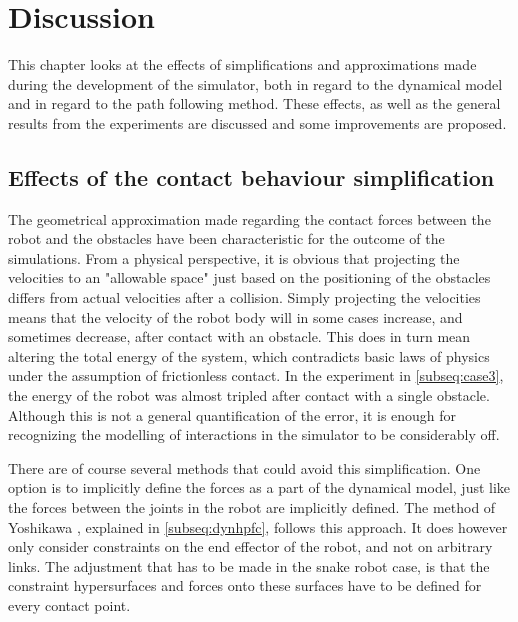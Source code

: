 \chapter{Discussion} \label{ch:discussion}

This chapter looks at the effects of simplifications and approximations made during the development of the simulator, both in regard to the dynamical model and in regard to the path following method. These effects, as well as the general results from the experiments are discussed and some improvements are proposed.

\section{Effects of the contact behaviour simplification}

The geometrical approximation made regarding the contact forces between the robot and the obstacles have been characteristic for the outcome of the simulations.
From a physical perspective, it is obvious that projecting the velocities to an "allowable space" just based on the positioning of the obstacles differs from actual velocities after a collision. Simply projecting the velocities means that the velocity of the robot body will in some cases increase, and sometimes decrease, after contact with an obstacle. This does in turn mean altering the total energy of the system, which contradicts basic laws of physics under the assumption of frictionless contact. In the experiment in \ref{subseq:case3}, the energy of the robot was almost tripled after contact with a single obstacle. Although this is not a general quantification of the error, it is enough for recognizing the modelling of interactions in the simulator to be considerably off.


There are of course several methods that could avoid this simplification.
One option is to implicitly define the forces as a part of the dynamical model, just like the forces between the joints in the robot are implicitly defined. The method of Yoshikawa \cite{yoshikawa1987dynamic}, explained in \ref{subseq:dynhpfc}, follows this approach. It does however only consider constraints on the end effector of the robot, and not on arbitrary links. The adjustment that has to be made in the snake robot case, is that the constraint hypersurfaces and forces onto these surfaces have to be defined for every contact point.

